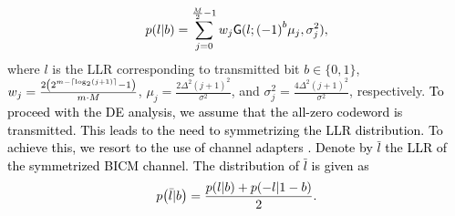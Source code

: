 \documentclass[journal]{IEEEtran}
\newcommand{\G}{\mathsf{G}}
\newcommand{\SH}{\textcolor{black}}
\newcommand{\GL}{\textcolor{black}}
\newcommand{\GLC}[1]{\textcolor{black}{\textbf{\textit{#1}}}}
\let\originalleft\left
\let\originalright\right
\renewcommand{\left}{\mathopen{}\mathclose\bgroup\originalleft}
\renewcommand{\right}{\aftergroup\egroup\originalright}
\begin{document}

\begin{align} \label{LLRMaxlog_approx}
p\left( {l|b} \right) = \sum\limits_{j = 0}^{\frac{M}{2} - 1} {{w_j}} {\G}({l;\left( { - 1} \right)^b}{\mu _j},\sigma _j^2),
\end{align} 
where $l$ is the LLR corresponding to transmitted bit $b \in \{0,1\}$, ${w_j} = \frac{{2\left( {{2^{m - \left\lceil {{{\log }_2}\left( {j + 1} \right)} \right\rceil }} - 1} \right)}}{{m \cdot M}}$, $\mu_j=\frac{2\Delta^2(j+1)^2}{\sigma^2}$, and $\sigma^2_j=\frac{4\Delta^2(j+1)^2}{\sigma^2}$, respectively. \GL{To proceed with the DE analysis, we assume that the all-zero codeword is transmitted. This leads to the need to symmetrizing the LLR distribution. To achieve this, we resort to the use of channel adapters \cite{Hou2003}.} 
\SH{Denote by $\bar l$ the LLR of the symmetrized BICM channel. The distribution of $\bar l$ is given as \cite[Eq.~(19)]{Ivanov2016}}
\begin{align} \label{LLRMaxlog_approxllr}
p\left( \bar{l} | b\right) =\frac{p\left( {l|b}\right)+p\left( {-l|1-b}\right)}{2}.
\end{align}  
\end{document}

